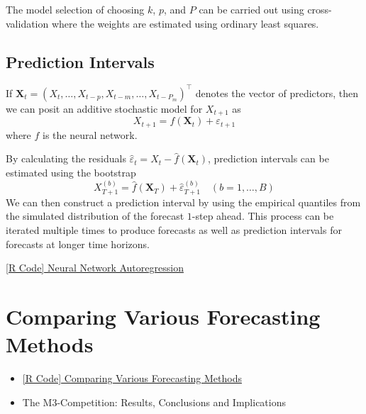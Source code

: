 The model selection of choosing $ k $, $ p $, and $ P $
can be carried out using cross-validation where the weights are estimated using ordinary
least squares.

\subsection*{Prediction Intervals}
If $ \symbf{X}_t=(X_t,\ldots,X_{t-p},X_{t-m},\ldots,X_{t-P_m})^\top $
denotes the vector of predictors, then we can posit an additive stochastic model for
$ X_{t+1} $ as
\[ X_{t+1}=f(\symbf{X}_t)+\varepsilon_{t+1} \]
where $ f $ is the neural network.

By calculating the residuals
$ \hat{\varepsilon}_t=X_t-\hat{f}(\symbf{X}_t) $,
prediction intervals can be estimated using the bootstrap
\[ X_{T+1}^{(b)}=\hat{f}(\symbf{X}_T)+\hat{\varepsilon}_{T+1}^{(b)}\quad(b=1,\ldots,B) \]
We can then construct a prediction interval by using
the empirical quantiles from the simulated distribution of the
forecast $ 1 $-step ahead. This process can be iterated multiple
times to produce forecasts as well as prediction intervals for
forecasts at longer time horizons.

\href{https://github.com/Hextical/university-notes/blob/master/year-3/semester-2/STAT%20443/code/8.1%20-%20Neural%20Network%20Autoregression.R}{[R Code] Neural Network Autoregression}
\section{Comparing Various Forecasting Methods}
\begin{itemize}
    \item \href{https://github.com/Hextical/university-notes/blob/master/year-3/semester-2/STAT%20443/code/8.2%20-%20Comparing%20Various%20Forecasting%20Methods.R}{[R Code] Comparing Various Forecasting Methods}
    \item The M3-Competition: Results, Conclusions and Implications
\end{itemize}
